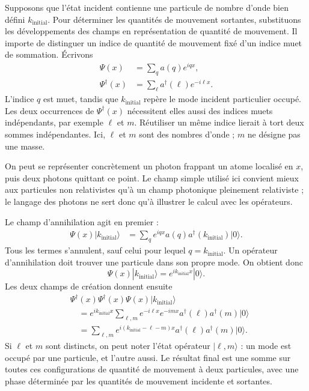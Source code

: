 Supposons que l’état incident contienne une particule de nombre d’onde bien défini \(k_{\mathrm{initial}}\). Pour déterminer les quantités de mouvement sortantes, substituons les développements des champs en représentation de quantité de mouvement. Il importe de distinguer un indice de quantité de mouvement fixé d’un indice muet de sommation. Écrivons
\begin{align}
\Psi(x)&=\sum_q a(q)e^{iqx},\\
\Psi^\dagger(x)&=\sum_\ell a^\dagger(\ell)e^{-i\ell x}.
\end{align}
L’indice \(q\) est muet, tandis que \(k_{\mathrm{initial}}\) repère le mode incident particulier occupé. Les deux occurrences de \(\Psi^\dagger(x)\) nécessitent elles aussi des indices muets indépendants, par exemple \(\ell\) et \(m\). Réutiliser un même indice lierait à tort deux sommes indépendantes. Ici, \(\ell\) et \(m\) sont des nombres d’onde ; \(m\) ne désigne pas une masse.

On peut se représenter concrètement un photon frappant un atome localisé en \(x\), puis deux photons quittant ce point. Le champ simple utilisé ici convient mieux aux particules non relativistes qu’à un champ photonique pleinement relativiste ; le langage des photons ne sert donc qu’à illustrer le calcul avec les opérateurs.

Le champ d’annihilation agit en premier :
\begin{align}
\Psi(x)|k_{\mathrm{initial}}\rangle
&=\sum_q e^{iqx}a(q)a^\dagger(k_{\mathrm{initial}})|0\rangle.
\end{align}
Tous les termes s’annulent, sauf celui pour lequel \(q=k_{\mathrm{initial}}\). Un opérateur d’annihilation doit trouver une particule dans son propre mode. On obtient donc
\begin{equation}
\Psi(x)|k_{\mathrm{initial}}\rangle
=e^{ik_{\mathrm{initial}}x}|0\rangle.
\end{equation}
Les deux champs de création donnent ensuite
\begin{align}
&\Psi^\dagger(x)\Psi^\dagger(x)\Psi(x)
|k_{\mathrm{initial}}\rangle
\\
&\quad=
e^{ik_{\mathrm{initial}}x}
\sum_{\ell,m}
e^{-i\ell x}e^{-imx}
a^\dagger(\ell)a^\dagger(m)|0\rangle
\\
&\quad=
\sum_{\ell,m}
e^{i(k_{\mathrm{initial}}-\ell-m)x}
a^\dagger(\ell)a^\dagger(m)|0\rangle.
\end{align}
Si \(\ell\) et \(m\) sont distincts, on peut noter l’état opérateur \(|\ell,m\rangle\) : un mode est occupé par une particule, et l’autre aussi. Le résultat final est une somme sur toutes ces configurations de quantité de mouvement à deux particules, avec une phase déterminée par les quantités de mouvement incidente et sortantes.


